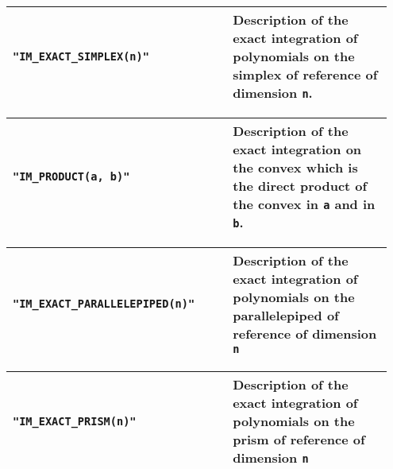 \begin{center} \begin{tabular}{|m{0.55\linewidth}|m{0.4\linewidth}|} \hline
{\tt "IM\_EXACT\_SIMPLEX(n)"} & Description of the exact integration of polynomials on the simplex of reference of dimension {\tt n}. \\ \hline
\end{tabular}  
\begin{tabular}{|m{0.55\linewidth}|m{0.4\linewidth}|} \hline
{\tt "IM\_PRODUCT(a, b)"} & Description of the exact integration on the convex which is the direct product of the convex in {\tt a} and in {\tt b}.\\ \hline
\end{tabular}  
\begin{tabular}{|m{0.55\linewidth}|m{0.4\linewidth}|} \hline
{\tt "IM\_EXACT\_PARALLELEPIPED(n)"} & Description of the exact integration of polynomials on the parallelepiped of reference of dimension {\tt n}\\ \hline
\end{tabular}  
\begin{tabular}{|m{0.55\linewidth}|m{0.4\linewidth}|} \hline
{\tt "IM\_EXACT\_PRISM(n)"} & Description of the exact integration of polynomials on the prism of reference of dimension {\tt n}\\ \hline
\end{tabular} \end{center}
